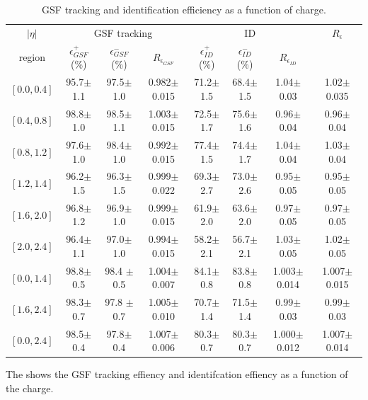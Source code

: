 \begin{table}[htbp]
\begin{center}
\begin{tabular}{cccccccc}
$|\eta|$  & \multicolumn{3}{c}{GSF tracking } & \multicolumn{3}{c}{ID } & $R_\epsilon$ \\
region    & $\epsilon_{GSF}^+$ (\%) &$\epsilon_{GSF}^-$ (\%) & $R_{\epsilon_{GSF}}$ 
                                              & $\epsilon_{ID}^+$ (\%) &$\epsilon_{ID}^-$ (\%) & $R_{\epsilon_{ID}}$ &  \\
\hline
$\left[ 0.0,0.4 \right]$ & 95.7$\pm$1.1 & 97.5$\pm$1.0 & 0.982$\pm$0.015 & 71.2$\pm$1.5 & 68.4$\pm$1.5 & 1.04$\pm$0.03 &1.02$\pm$0.035  \\
$\left[ 0.4,0.8 \right]$ & 98.8$\pm$ 1.0& 98.5$\pm$1.1 & 1.003$\pm$0.015 & 72.5$\pm$1.7 & 75.6$\pm$1.6 & 0.96$\pm$0.04 &0.96$\pm$ 0.04 \\
$\left[ 0.8,1.2 \right]$ & 97.6$\pm$ 1.0& 98.4$\pm$1.0 & 0.992$\pm$0.015 & 77.4$\pm$1.5 & 74.4$\pm$1.7 & 1.04$\pm$0.04 &1.03$\pm$ 0.04 \\
$\left[ 1.2,1.4 \right]$ & 96.2$\pm$ 1.5& 96.3$\pm$1.5 & 0.999$\pm$0.022 & 69.3$\pm$2.7 & 73.0$\pm$2.6 & 0.95$\pm$0.05 &0.95$\pm$0.05  \\
$\left[ 1.6,2.0 \right]$ & 96.8$\pm$ 1.2& 96.9$\pm$1.0 & 0.999$\pm$0.015 & 61.9$\pm$2.0 & 63.6$\pm$2.0 & 0.97$\pm$0.05 &0.97$\pm$0.05  \\
$\left[ 2.0,2.4 \right]$ & 96.4$\pm$ 1.1& 97.0$\pm$1.0 & 0.994$\pm$0.015 & 58.2$\pm$2.1 & 56.7$\pm$2.1 & 1.03$\pm$0.05 &1.02$\pm$0.05  \\
\hline
$\left[ 0.0,1.4 \right]$ & 98.8$\pm$0.5 & 98.4 $\pm$0.5 & 1.004$\pm$0.007 & 84.1$\pm$0.8 & 83.8$\pm$0.8 & 1.003$\pm$0.014 & 1.007$\pm$ 0.015 \\
$\left[ 1.6,2.4 \right]$ & 98.3$\pm$0.7 & 97.8 $\pm$0.7 & 1.005$\pm$0.010 & 70.7$\pm$1.4 & 71.5$\pm$1.4 & 0.99$\pm$0.03 &0.99$\pm$ 0.03 \\
\hline 
$\left[ 0.0,2.4 \right]$ & 98.5$\pm$0.4 & 97.8$\pm$0.4 & 1.007$\pm$0.006 & 80.3$\pm$0.7 & 80.3$\pm$0.7 & 1.000$\pm$0.012 &1.007$\pm$0.014  \\
\end{tabular}
\end{center}
\caption{ GSF tracking and identification efficiency as a function of charge.}
\label{asym36:tagprobe}
\end{table}

The  shows the GSF tracking effiency and identifcation 
effiency as a function of the charge.


